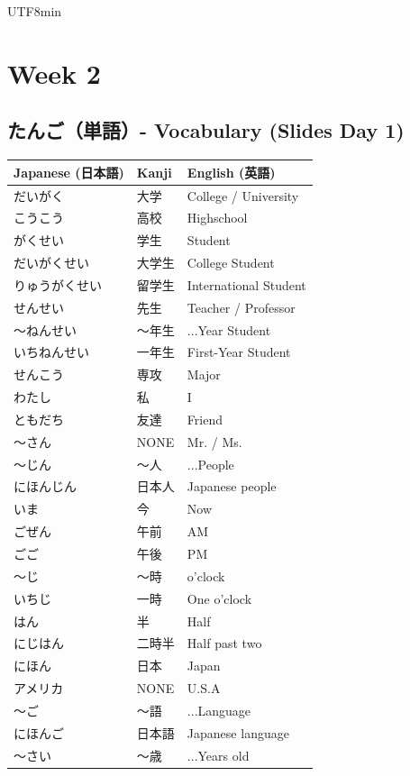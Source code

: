 \documentclass[11pt]{article}
\begin{document}
\begin{CJK}{UTF8}{min}
\newpage
\section{Week 2}

\subsection{たんご（単語）- Vocabulary (Slides Day 1)}
\begin{tabularx}{\textwidth}{X | X | X}
    \toprule
    \textbf{Japanese (日本語)} & \textbf{Kanji} & \textbf{English (英語)} \\
    \midrule
    だいがく & 大学 & College / University \\
    こうこう & 高校 & Highschool \\
    がくせい & 学生 & Student \\
    だいがくせい & 大学生 & College Student \\
    りゅうがくせい & 留学生 & International Student \\
    せんせい & 先生 & Teacher / Professor \\
    〜ねんせい & 〜年生 & ...Year Student \\
    いちねんせい & 一年生 & First-Year Student \\
    せんこう & 専攻 & Major \\
    わたし & 私 & I \\
    ともだち & 友達 & Friend \\
    〜さん & NONE & Mr. / Ms. \\
    〜じん & 〜人 & ...People \\
    にほんじん & 日本人 & Japanese people \\
    いま & 今 & Now \\
    ごぜん & 午前 & AM \\
    ごご & 午後 & PM \\
    〜じ & 〜時 & o'clock \\
    いちじ & 一時 & One o'clock \\
    はん & 半 & Half \\
    にじはん & 二時半 & Half past two \\
    にほん & 日本 & Japan \\
    アメリカ & NONE & U.S.A \\
    〜ご & 〜語 & ...Language \\
    にほんご & 日本語 & Japanese language \\
    〜さい & 〜歳 & ...Years old \\

\end{tabularx}
\end{CJK}
\end{document}
